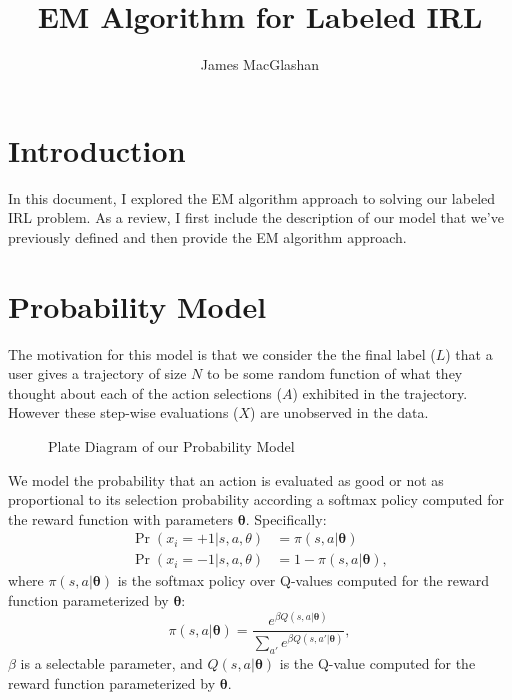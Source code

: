 \documentclass{article}
\title{EM Algorithm for Labeled IRL}
\author{James MacGlashan}
\date{}
\begin{document}
\maketitle

\section{Introduction}
In this document, I explored the EM algorithm approach to solving our labeled IRL problem. As a review, I first include the description of our model that we've previously defined and then provide the EM algorithm approach.

\section{Probability Model}
The motivation for this model is that we consider the the final label ($L$) that a user gives a trajectory of size $N$ to be some random function of what they thought about each of the action selections ($A$) exhibited in the trajectory. However these step-wise evaluations ($X$) are unobserved in the data.
\begin{figure}
\centering
{}
\caption{Plate Diagram of our Probability Model}
\label{fig:gm}
\end{figure}

We model the probability that an action is evaluated as good or not as proportional to its selection probability according a softmax policy computed for the reward function with parameters $\bm{\theta}$. Specifically:
\begin{align}
\Pr(x_i = +1 | s, a, \theta) &= \pi(s, a | \bm{\theta}) \\
\Pr(x_i = -1 | s, a, \theta) &= 1 - \pi(s, a | \bm{\theta}),
\end{align}
where $\pi(s, a | \bm{\theta})$ is the softmax policy over Q-values computed for the reward function parameterized by $\bm{\theta}$:
\begin{equation}
\pi(s, a | \bm{\theta}) = \frac{e^{\beta Q(s,a | \bm{\theta})}}{\sum_{a'}e^{\beta Q(s,a' | \bm{\theta})}},
\end{equation}
$\beta$ is a selectable parameter, and $Q(s,a|\bm{\theta})$ is the Q-value computed for the reward function parameterized by $\bm{\theta}$.
\end{document}
